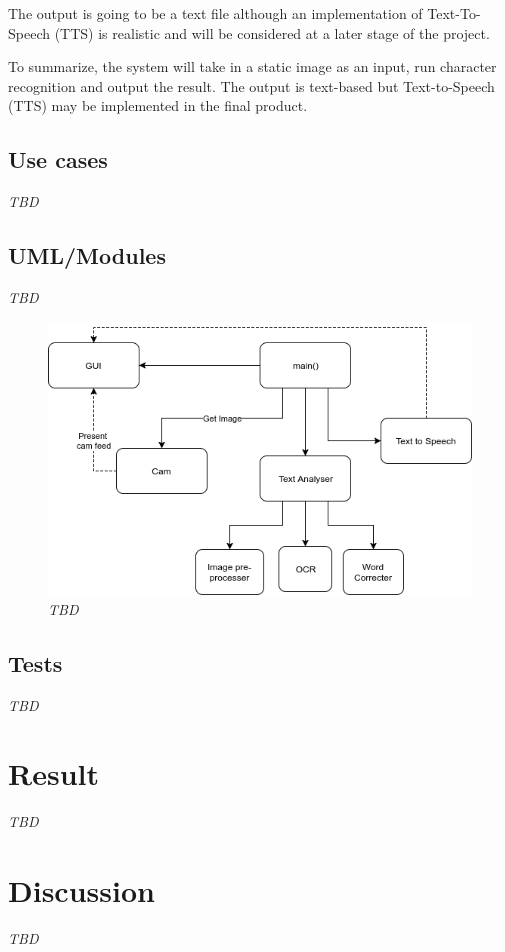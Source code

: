 \documentclass[a4paper, english]{scrartcl}
\begin{document}
The output is going to be a text file although an implementation of
Text-To-Speech (TTS) is realistic and will be considered at a later stage of
the project.

To summarize, the system will take in a static image as an input, run
character recognition and output the result. The output is text-based but
Text-to-Speech (TTS) may be implemented in the final product.
\subsection{Use cases}
\textit{TBD}

\subsection{UML/Modules}
\textit{TBD}
\begin{figure}[h!]
  \centering
  \caption{\textit{TBD}}\label{fig:ex1a}
  \includegraphics[width=1.0\textwidth]{res/UML1}
\end{figure}

\subsection{Tests}
\textit{TBD}

\section{Result}
\textit{TBD}

\section{Discussion}
\textit{TBD}

\pagebreak


\end{document}

